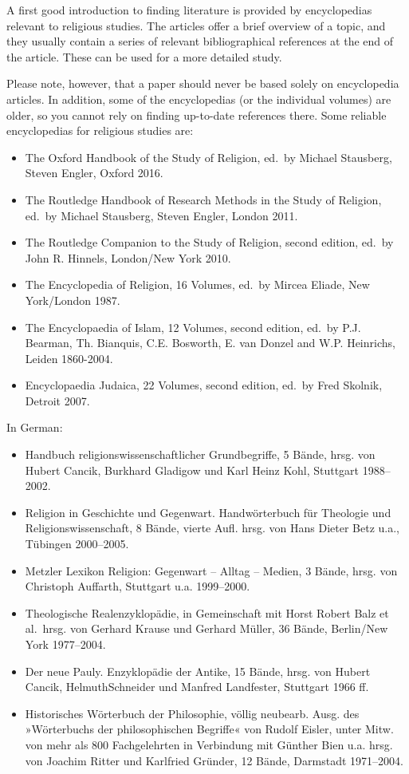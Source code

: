 \documentclass[
  english,
]{scrreprt}
\begin{document}
A first good introduction to finding literature is provided by encyclopedias relevant to religious studies. The articles offer a brief overview of a topic, and they usually contain a series of relevant bibliographical references at the end of the article. These can be used for a more detailed study.

Please note, however, that a paper should never be based solely on encyclopedia articles. In addition, some of the encyclopedias (or the individual volumes) are older, so you cannot rely on finding up-to-date references there. Some reliable encyclopedias for religious studies are:

\begin{itemize}
\item
  The Oxford Handbook of the Study of Religion, ed.~by Michael Stausberg, Steven Engler, Oxford 2016.
\item
  The Routledge Handbook of Research Methods in the Study of Religion, ed.~by Michael Stausberg, Steven Engler, London 2011.
\item
  The Routledge Companion to the Study of Religion, second edition, ed.~by John R. Hinnels, London/New York 2010.
\item
  The Encyclopedia of Religion, 16 Volumes, ed.~by Mircea Eliade, New York/London 1987.
\item
  The Encyclopaedia of Islam, 12 Volumes, second edition, ed.~by P.J. Bearman, Th. Bianquis, C.E. Bosworth, E. van Donzel and W.P. Heinrichs, Leiden 1860-2004.
\item
  Encyclopaedia Judaica, 22 Volumes, second edition, ed.~by Fred Skolnik, Detroit 2007.
\end{itemize}

In German:

\begin{itemize}
\item
  Handbuch religionswissenschaftlicher Grundbegriffe, 5 Bände, hrsg. von Hubert Cancik, Burkhard Gladigow und Karl Heinz Kohl, Stuttgart 1988–2002.
\item
  Religion in Geschichte und Gegenwart. Handwörterbuch für Theologie und Religionswissenschaft, 8 Bände, vierte Aufl. hrsg. von Hans Dieter Betz u.a., Tübingen 2000–2005.
\item
  Metzler Lexikon Religion: Gegenwart – Alltag – Medien, 3 Bände, hrsg. von Christoph Auffarth, Stuttgart u.a. 1999–2000.
\item
  Theologische Realenzyklopädie, in Gemeinschaft mit Horst Robert Balz et al.~hrsg. von Gerhard Krause und Gerhard Müller, 36 Bände, Berlin/New York 1977–2004.
\item
  Der neue Pauly. Enzyklopädie der Antike, 15 Bände, hrsg. von Hubert Cancik, HelmuthSchneider und Manfred Landfester, Stuttgart 1966 ff.
\item
  Historisches Wörterbuch der Philosophie, völlig neubearb. Ausg. des »Wörterbuchs der philosophischen Begriffe« von Rudolf Eisler, unter Mitw. von mehr als 800 Fachgelehrten in Verbindung mit Günther Bien u.a. hrsg. von Joachim Ritter und Karlfried Gründer, 12 Bände, Darmstadt 1971–2004.
\end{itemize}
\end{document}
